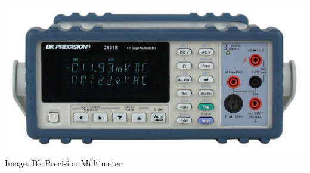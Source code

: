 \documentclass[fleqn]{beamer} %
\begin{document}
\begin{frame}
\begin{multicols}{2}
		\includegraphics[scale=.13]{bk_2831e.jpg}
		\vspace{10mm}
		\tiny{Image: Bk Precision Multimeter }	
		\vspace{10mm}

		\end{multicols}	


	\end{frame}
\end{document}
